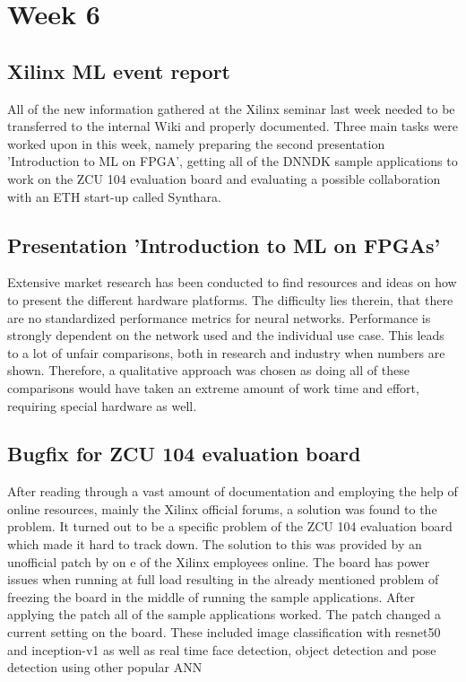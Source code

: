 \section{Week 6}
\subsection{Xilinx \acs{ML} event report}
All of the new information gathered at the Xilinx seminar last week needed to be transferred to the internal Wiki and properly documented. 
Three main tasks were worked upon in this week, namely preparing the second presentation 'Introduction to \ac{ML} on \ac{FPGA}', getting all of the \ac{DNNDK} sample applications to work on the ZCU 104 evaluation board and evaluating a possible collaboration with an ETH start-up called Synthara.
\subsection{Presentation 'Introduction to \ac{ML} on \acp{FPGA}'}
Extensive market research has been conducted to find resources and ideas on how to present the different hardware platforms. The difficulty lies therein, that there are no standardized performance metrics for neural networks. Performance is strongly dependent on the network used and the individual use case. This leads to a lot of unfair comparisons, both in research and industry when numbers are shown. Therefore, a qualitative approach was chosen as doing all of these comparisons would have taken an extreme amount of work time and effort, requiring special hardware as well.
\subsection{Bugfix for ZCU 104 evaluation board}
After reading through a vast amount of documentation and employing the help of online resources, mainly the Xilinx official forums, a solution was found to the problem. It turned out to be a specific problem of the ZCU 104 evaluation board which made it hard to track down. The solution to this was provided by an unofficial patch by on e of the Xilinx employees online. The board has power issues when running at full load resulting in the already mentioned problem of freezing the board in the middle of running the sample applications. After applying the patch all of the sample applications worked. The patch changed a current setting on the board. These included image classification with resnet50 and inception-v1 as well as real time face detection, object detection and pose detection using other popular \ac{ANN}
